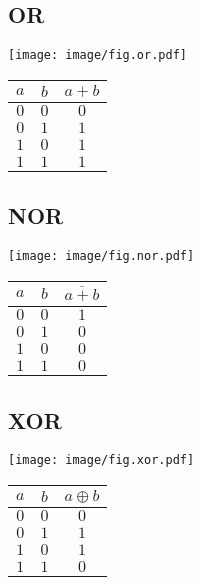 \begin{multicols}{4}
	\columnbreak

	\subsection*{OR}
	\begin{minipage}[t][2em][c]{\linewidth}
		\centering
		\texttt{[image: image/fig.or.pdf]}
	\end{minipage}
	\begin{center}
		\begin{tabular}{cc|c}
			\toprule
			$a$ & $b$ & $a+b$ \\
			\midrule
			$0$ & $0$ & $0$   \\
			$0$ & $1$ & $1$   \\
			$1$ & $0$ & $1$   \\
			$1$ & $1$ & $1$   \\
			\bottomrule
		\end{tabular}
	\end{center}

	\subsection*{NOR}
	\begin{minipage}[t][2em][c]{\linewidth}
		\centering
		\texttt{[image: image/fig.nor.pdf]}
	\end{minipage}
	\begin{center}
		\begin{tabular}{cc|c}
			\toprule
			$a$ & $b$ & $\overline{a+b}$ \\
			\midrule
			$0$ & $0$ & $1$              \\
			$0$ & $1$ & $0$              \\
			$1$ & $0$ & $0$              \\
			$1$ & $1$ & $0$              \\
			\bottomrule
		\end{tabular}
	\end{center}

	\columnbreak

	\subsection*{XOR}
	\begin{minipage}[t][2em][c]{\linewidth}
		\centering
		\texttt{[image: image/fig.xor.pdf]}
	\end{minipage}
	\begin{center}
		\begin{tabular}{cc|c}
			\toprule
			$a$ & $b$ & $a \oplus b$ \\
			\midrule
			$0$ & $0$ & $0$          \\
			$0$ & $1$ & $1$          \\
			$1$ & $0$ & $1$          \\
			$1$ & $1$ & $0$          \\
			\bottomrule
		\end{tabular}
	\end{center}


\end{multicols}
